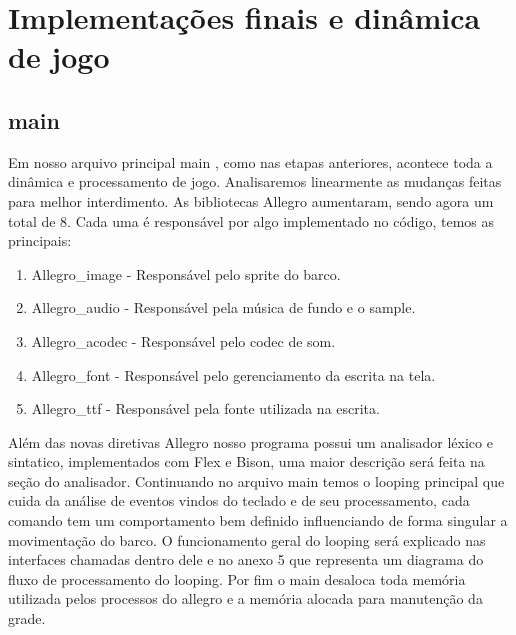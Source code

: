 \documentclass[a4paper,11pt]{article}
\begin{document}
\section{Implementa\c{c}ões finais e dinâmica de jogo}
\subsection{main}
Em nosso arquivo principal main , como nas etapas anteriores, acontece toda a dinâmica e processamento de jogo. Analisaremos linearmente as mudan\c{c}as feitas para melhor interdimento.
As bibliotecas Allegro aumentaram, sendo agora um total de 8. Cada uma é responsável por algo implementado no código, temos as principais:

\begin{enumerate}
\item[]{Allegro\_image - Responsável pelo sprite do barco.}
\item[]{Allegro\_audio - Responsável pela música de fundo e o sample.}
\item[]{Allegro\_acodec - Responsável pelo codec de som.}
\item[]{Allegro\_font - Responsável pelo gerenciamento da escrita na tela.}
\item[]{Allegro\_ttf - Responsável pela fonte utilizada na escrita.}
\end{enumerate}

Além das novas diretivas Allegro nosso programa possui um analisador léxico e sintatico, implementados com Flex e Bison, uma maior descri\c{c}ão será feita na se\c{c}ão do analisador. Continuando no arquivo main temos o looping principal que cuida da análise de eventos vindos do teclado e de seu processamento, cada comando tem um comportamento bem definido influenciando de forma singular a movimenta\c{c}ão do barco. O funcionamento geral do looping será explicado nas interfaces chamadas dentro dele e no anexo 5 que representa um diagrama do fluxo de processamento do looping. Por fim o main desaloca toda memória utilizada pelos processos do allegro e a memória alocada para manuten\c{c}ão da grade.
\end{document}
